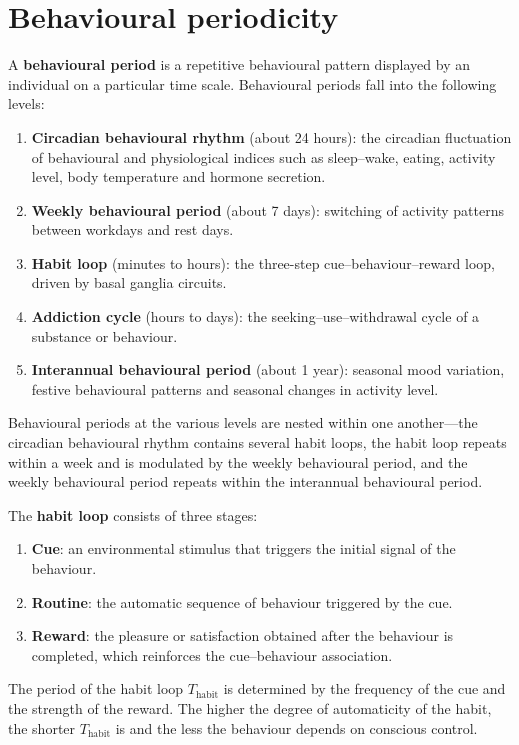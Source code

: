 \section{Behavioural periodicity}

\begin{definition}\label{def:behaviour_periodicity}
A \textbf{behavioural period} is a repetitive behavioural pattern displayed by an individual on a particular time scale. Behavioural periods fall into the following levels:
\begin{enumerate}[label=(\roman*)]
    \item \textbf{Circadian behavioural rhythm} (about 24 hours): the circadian fluctuation of behavioural and physiological indices such as sleep--wake, eating, activity level, body temperature and hormone secretion.
    \item \textbf{Weekly behavioural period} (about 7 days): switching of activity patterns between workdays and rest days.
    \item \textbf{Habit loop} (minutes to hours): the three-step cue--behaviour--reward loop, driven by basal ganglia circuits.
    \item \textbf{Addiction cycle} (hours to days): the seeking--use--withdrawal cycle of a substance or behaviour.
    \item \textbf{Interannual behavioural period} (about 1 year): seasonal mood variation, festive behavioural patterns and seasonal changes in activity level.
\end{enumerate}
Behavioural periods at the various levels are nested within one another---the circadian behavioural rhythm contains several habit loops, the habit loop repeats within a week and is modulated by the weekly behavioural period, and the weekly behavioural period repeats within the interannual behavioural period.
\end{definition}

\begin{definition}\label{def:habit_loop}
The \textbf{habit loop} consists of three stages:
\begin{enumerate}[label=(\roman*)]
    \item \textbf{Cue}: an environmental stimulus that triggers the initial signal of the behaviour.
    \item \textbf{Routine}: the automatic sequence of behaviour triggered by the cue.
    \item \textbf{Reward}: the pleasure or satisfaction obtained after the behaviour is completed, which reinforces the cue--behaviour association.
\end{enumerate}
The period of the habit loop $T_{\text{habit}}$ is determined by the frequency of the cue and the strength of the reward. The higher the degree of automaticity of the habit, the shorter $T_{\text{habit}}$ is and the less the behaviour depends on conscious control.
\end{definition}

